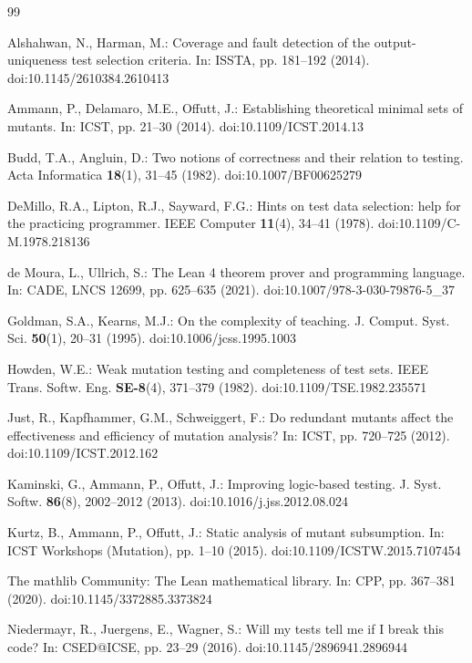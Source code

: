 \documentclass[conference]{IEEEtran}
\theoremstyle{run}
\begin{document}
\begin{thebibliography}{99}

Alshahwan, N., Harman, M.: Coverage and fault detection of the output-uniqueness test selection criteria. In: ISSTA, pp. 181--192 (2014). doi:10.1145/2610384.2610413

Ammann, P., Delamaro, M.E., Offutt, J.: Establishing theoretical minimal sets of mutants. In: ICST, pp. 21--30 (2014). doi:10.1109/ICST.2014.13

Budd, T.A., Angluin, D.: Two notions of correctness and their relation to testing. Acta Informatica \textbf{18}(1), 31--45 (1982). doi:10.1007/BF00625279

DeMillo, R.A., Lipton, R.J., Sayward, F.G.: Hints on test data selection: help for the practicing programmer. IEEE Computer \textbf{11}(4), 34--41 (1978). doi:10.1109/C-M.1978.218136

de Moura, L., Ullrich, S.: The Lean 4 theorem prover and programming language. In: CADE, LNCS 12699, pp. 625--635 (2021). doi:10.1007/978-3-030-79876-5\_37

Goldman, S.A., Kearns, M.J.: On the complexity of teaching. J. Comput. Syst. Sci. \textbf{50}(1), 20--31 (1995). doi:10.1006/jcss.1995.1003

Howden, W.E.: Weak mutation testing and completeness of test sets. IEEE Trans. Softw. Eng. \textbf{SE-8}(4), 371--379 (1982). doi:10.1109/TSE.1982.235571

Just, R., Kapfhammer, G.M., Schweiggert, F.: Do redundant mutants affect the effectiveness and efficiency of mutation analysis? In: ICST, pp. 720--725 (2012). doi:10.1109/ICST.2012.162

Kaminski, G., Ammann, P., Offutt, J.: Improving logic-based testing. J. Syst. Softw. \textbf{86}(8), 2002--2012 (2013). doi:10.1016/j.jss.2012.08.024

Kurtz, B., Ammann, P., Offutt, J.: Static analysis of mutant subsumption. In: ICST Workshops (Mutation), pp. 1--10 (2015). doi:10.1109/ICSTW.2015.7107454

The mathlib Community: The Lean mathematical library. In: CPP, pp. 367--381 (2020). doi:10.1145/3372885.3373824

Niedermayr, R., Juergens, E., Wagner, S.: Will my tests tell me if I break this code? In: CSED@ICSE, pp. 23--29 (2016). doi:10.1145/2896941.2896944


\end{thebibliography}
\end{document}
